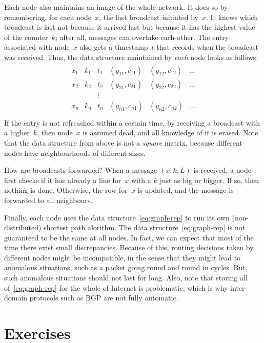 Each node also maintains an image of the whole network.
It does so by remembering, for each node~$x$, the last broadcast initiated by~$x$.
It knows which broadcast is last not because it arrived last
  but because it has the highest value of the counter~$k$;
  after all, messages can overtake each-other.
The entry associated with node~$x$ also gets a timestamp~$t$
  that records when the broadcast was received.
Thus, the data structure maintained by \emph{each} node looks as follows:
\begin{align}
\begin{array}{cccccc}
  x_1 & k_1 & t_1 & (y_{11}, c_{11}) & (y_{12}, c_{12}) & \ldots \\
  x_2 & k_2 & t_2 & (y_{21}, c_{21}) & (y_{22}, c_{22}) & \ldots \\
  &&\vdots\\
  x_n & k_n & t_n & (y_{n1}, c_{n1}) & (y_{n2}, c_{n2}) & \ldots \\
\end{array}
\label{eq:graph-rep}
\end{align}
If the entry is not refreashed within a certain time,
  by receiving a broadcast with a higher~$k$,
  then node~$x$ is assumed dead, and all knowledge of it is erased.
Note that the data structure from above is not a \emph{square} matrix,
  because different nodes have neighbourhoods of different sizes.

How are broadcasts forwarded?
When a message $(x,k,L)$ is received,
  a node first checks if it has already a line for~$x$
    with a $k$ just as big or bigger.
If so, then nothing is done.
Otherwise, the row for~$x$ is updated,
  and the message is forwarded to all neighbours.

Finally, each node uses the data structure~\eqref{eq:graph-rep}
  to run its own (non-distributed) shortest path alorithm.
The data structure~\eqref{eq:graph-rep} is not guaranteed to be the same at all nodes.
In fact, we can expect that most of the time there exist small discrepancies.
Because of this,
  routing decisions taken by different nodes might be incompatible,
  in the sense that they might lead to anomalous situations,
    such as a packet going round and round in cycles.
But, such anomalous situations should not last for long.
Also,
  note that storing all of~\eqref{eq:graph-rep} for the whole of Internet
    is problematic,
  which is why inter-domain protocols such as BGP are not fully automatic.


\section*{Exercises}

